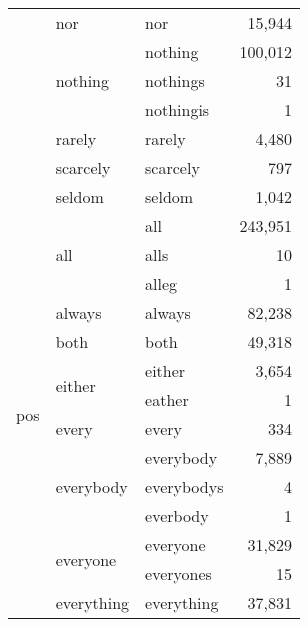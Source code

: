 \begin{longtable}[ht]{lllr}
\cline{2-4}
 & nor & nor & {\cellcolor[HTML]{E7D7F8}} \color[HTML]{000000} 15,944 \\
\cline{2-4}
 & \multirow[c]{3}{*}{nothing} & nothing & {\cellcolor[HTML]{EE86EE}} \color[HTML]{000000} 100,012 \\
 &  & nothings & {\cellcolor[HTML]{E6E6FA}} \color[HTML]{000000} 31 \\
 &  & nothingis & {\cellcolor[HTML]{E6E6FA}} \color[HTML]{000000} 1 \\
\cline{2-4}
 & rarely & rarely & {\cellcolor[HTML]{E6E2FA}} \color[HTML]{000000} 4,480 \\
\cline{2-4}
 & scarcely & scarcely & {\cellcolor[HTML]{E6E6FA}} \color[HTML]{000000} 797 \\
\cline{2-4}
 & seldom & seldom & {\cellcolor[HTML]{E6E6FA}} \color[HTML]{000000} 1,042 \\
\cline{1-4} \cline{2-4}
\multirow[c]{35}{*}{pos} & \multirow[c]{3}{*}{all} & all & {\cellcolor[HTML]{6D0081}} \color[HTML]{F1F1F1} 243,951 \\
 &  & alls & {\cellcolor[HTML]{E6E6FA}} \color[HTML]{000000} 10 \\
 &  & alleg & {\cellcolor[HTML]{E6E6FA}} \color[HTML]{000000} 1 \\
\cline{2-4}
 & always & always & {\cellcolor[HTML]{EC96F0}} \color[HTML]{000000} 82,238 \\
\cline{2-4}
 & both & both & {\cellcolor[HTML]{EAB7F4}} \color[HTML]{000000} 49,318 \\
\cline{2-4}
 & \multirow[c]{2}{*}{either} & either & {\cellcolor[HTML]{E6E2FA}} \color[HTML]{000000} 3,654 \\
 &  & eather & {\cellcolor[HTML]{E6E6FA}} \color[HTML]{000000} 1 \\
\cline{2-4}
 & every & every & {\cellcolor[HTML]{E6E6FA}} \color[HTML]{000000} 334 \\
\cline{2-4}
 & \multirow[c]{3}{*}{everybody} & everybody & {\cellcolor[HTML]{E7DFF9}} \color[HTML]{000000} 7,889 \\
 &  & everybodys & {\cellcolor[HTML]{E6E6FA}} \color[HTML]{000000} 4 \\
 &  & everbody & {\cellcolor[HTML]{E6E6FA}} \color[HTML]{000000} 1 \\
\cline{2-4}
 & \multirow[c]{2}{*}{everyone} & everyone & {\cellcolor[HTML]{E8C7F6}} \color[HTML]{000000} 31,829 \\
 &  & everyones & {\cellcolor[HTML]{E6E6FA}} \color[HTML]{000000} 15 \\
\cline{2-4}
 & \multirow[c]{3}{*}{everything} & everything & {\cellcolor[HTML]{E9C2F6}} \color[HTML]{000000} 37,831 \\

\end{longtable}
